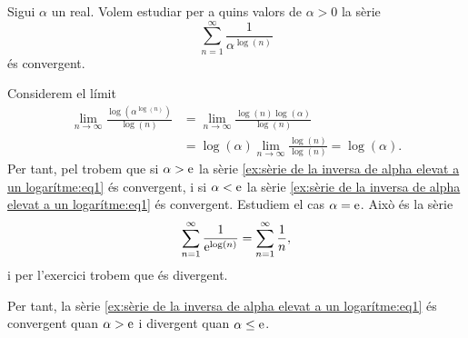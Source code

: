 \documentclass[../Apunts.tex]{subfiles}
\begin{document}
	\begin{example}
		\label{ex:sèrie de la inversa de alpha elevat a un logarítme}
		Sigui \(\alpha\) un real. Volem estudiar per a quins valors de \(\alpha>0\) la sèrie
		\begin{equation}
			\label{ex:sèrie de la inversa de alpha elevat a un logarítme:eq1}
			\sum_{n=1}^{\infty}\frac{1}{\alpha^{\log(n)}}
		\end{equation}
		és convergent.
		\begin{solution}
			Considerem el límit
			\begin{align*}
				\lim_{n\to\infty}\frac{\log\left(\alpha^{\log(n)}\right)}{\log(n)}&=\lim_{n\to\infty}\frac{\log(n)\log(\alpha)}{\log(n)} \\
				&=\log(\alpha)\lim_{n\to\infty}\frac{\log(n)}{\log(n)}=\log(\alpha).
			\end{align*}
			Per tant, pel  trobem que si \(\alpha>\textrm{e}\) la sèrie \eqref{ex:sèrie de la inversa de alpha elevat a un logarítme:eq1} és convergent, i si \(\alpha<\textrm{e}\) la sèrie \eqref{ex:sèrie de la inversa de alpha elevat a un logarítme:eq1} és convergent. Estudiem el cas \(\alpha=\textrm{e}\). Això és la sèrie
			\[\sum_{n=1}^{\infty}\frac{1}{\textrm{e}^{\log(n)}}=\sum_{n=1}^{\infty}\frac{1}{n},\]
			i per l'exercici  trobem que és divergent.
			
			Per tant, la sèrie \eqref{ex:sèrie de la inversa de alpha elevat a un logarítme:eq1} és convergent quan \(\alpha>\textrm{e}\) i divergent quan \(\alpha\leq\textrm{e}\).
		\end{solution}
	\end{example}
\end{document}
